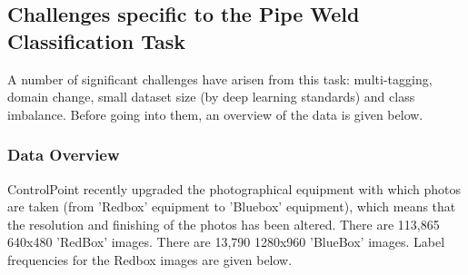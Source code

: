 \documentclass[a4paper,11pt]{article}
\begin{document}


\subsection{Challenges specific to the Pipe Weld Classification Task}

A number of significant challenges have arisen from this task: multi-tagging, domain change, small dataset size (by deep learning standards) and class imbalance. Before going into them, an overview of the data is given below. \\

\subsubsection{Data Overview}


ControlPoint recently upgraded the photographical equipment with which photos are taken (from 'Redbox' equipment to 'Bluebox' equipment), which means that the resolution and finishing of the photos has been altered. There are 113,865 640x480 'RedBox' images. There are 13,790 1280x960 'BlueBox' images. Label frequencies for the Redbox images are given below.
\end{document}
